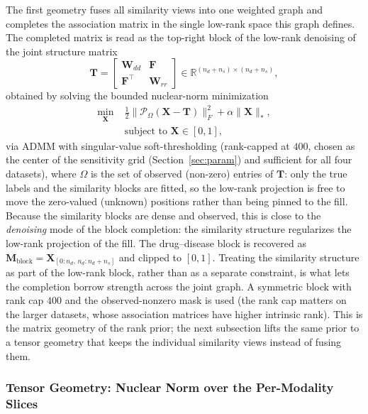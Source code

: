 \documentclass[webpdf,modern,large]{oup-authoring-template}
\newcommand{\R}{\mathbb{R}}
\begin{document}
The first geometry fuses all similarity views into one weighted graph and completes the association matrix in the single low-rank space this graph defines. The completed matrix is read as the top-right block of the low-rank denoising of the joint structure matrix
\begin{equation}
\mathbf{T} = \begin{bmatrix} \mathbf{W}_{dd} & \mathbf{F} \\ \mathbf{F}^\top & \mathbf{W}_{rr} \end{bmatrix} \in \R^{(n_d+n_s)\times(n_d+n_s)},
\label{eq:block}
\end{equation}
obtained by solving the bounded nuclear-norm minimization \citep{yang2019}
\begin{equation}
\begin{split}
\min_{\mathbf{X}} \; &\tfrac{1}{2}\lVert \mathcal{P}_\Omega(\mathbf{X}-\mathbf{T}) \rVert_F^2 + \alpha \lVert \mathbf{X} \rVert_*, \\
&\text{subject to } \mathbf{X}\in[0,1],
\end{split}
\label{eq:bnnr}
\end{equation}
via ADMM \citep{boyd2011} with singular-value soft-thresholding \citep{cai2010} (rank-capped at $400$, chosen as the center of the sensitivity grid (Section~\ref{sec:param}) and sufficient for all four datasets), where $\Omega$ is the set of observed (non-zero) entries of $\mathbf{T}$: only the true labels and the similarity blocks are fitted, so the low-rank projection is free to move the zero-valued (unknown) positions rather than being pinned to the fill. Because the similarity blocks are dense and observed, this is close to the \emph{denoising} mode of the block completion: the similarity structure regularizes the low-rank projection of the fill. The drug--disease block is recovered as $\mathbf{M}_{\text{block}} = \mathbf{X}_{[0:n_d,\,n_d:n_d+n_s]}$ and clipped to $[0,1]$. Treating the similarity structure as part of the low-rank block, rather than as a separate constraint, is what lets the completion borrow strength across the joint graph. A symmetric block with rank cap $400$ and the observed-nonzero mask is used (the rank cap matters on the larger datasets, whose association matrices have higher intrinsic rank). This is the matrix geometry of the rank prior; the next subsection lifts the same prior to a tensor geometry that keeps the individual similarity views instead of fusing them.

\subsubsection{Tensor Geometry: Nuclear Norm over the Per-Modality Slices}
\end{document}
